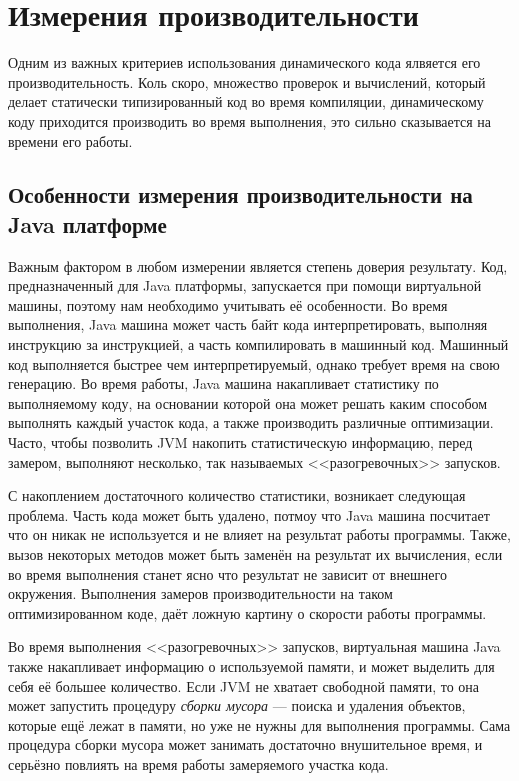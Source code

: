 \section{Измерения производительности}

Одним из важных критериев использования динамического кода ялвяется его производительность. Коль скоро, множество проверок и вычислений, который делает статически типизированный код во время компиляции, динамическому коду приходится производить во время выполнения, это сильно сказывается на времени его работы.

\subsection{Особенности измерения производительности на Java платформе}

Важным фактором в любом измерении является степень доверия результату. Код, предназначенный для Java платформы, запускается при помощи виртуальной машины, поэтому нам необходимо учитывать её особенности. Во время выполнения, Java машина может часть байт кода интерпретировать, выполняя инструкцию за инструкцией, а часть  компилировать в машинный код. Машинный код выполняется быстрее чем интерпретируемый, однако требует время на свою генерацию. Во время работы, Java машина накапливает статистику по выполняемому коду, на основании которой она может решать каким способом выполнять каждый участок кода, а также производить различные оптимизации. Часто, чтобы позволить JVM накопить статистическую информацию, перед замером, выполняют несколько, так называемых <<разогревочных>> запусков.

С накоплением достаточного количество статистики, возникает следующая проблема. Часть кода может быть удалено, потмоу что Java машина посчитает что он никак не используется и не влияет на результат работы программы. Также, вызов некоторых методов может быть заменён на результат их вычисления, если во время выполнения станет ясно что результат не зависит от внешнего окружения. Выполнения замеров производительности на таком оптимизированном коде, даёт ложную картину о скорости работы программы.

Во время выполнения <<разогревочных>> запусков, виртуальная машина Java также накапливает информацию о используемой памяти, и может выделить для себя её большее количество. Если JVM не хватает свободной памяти, то она может запустить процедуру \textit{сборки мусора} --- поиска и удаления объектов, которые ещё лежат в памяти, но уже не нужны для выполнения программы. Сама процедура сборки мусора может занимать достаточно внушительное время, и серьёзно повлиять на время работы замеряемого участка кода.

